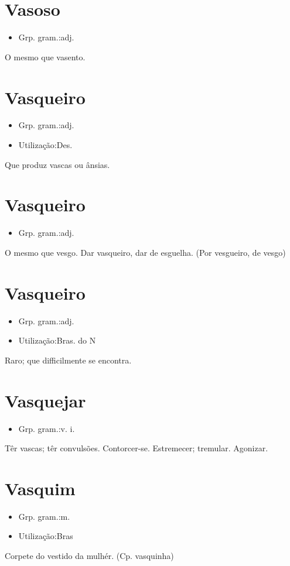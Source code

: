\documentclass{article}
\begin{document}
\section{Vasoso}
\begin{itemize}
\item {Grp. gram.:adj.}
\end{itemize}
O mesmo que \textunderscore vasento\textunderscore .
\section{Vasqueiro}
\begin{itemize}
\item {Grp. gram.:adj.}
\end{itemize}
\begin{itemize}
\item {Utilização:Des.}
\end{itemize}
Que produz vascas ou ânsias.
\section{Vasqueiro}
\begin{itemize}
\item {Grp. gram.:adj.}
\end{itemize}
O mesmo que \textunderscore vesgo\textunderscore .
\textunderscore Dar vasqueiro\textunderscore , dar de esguelha.
(Por \textunderscore vesgueiro\textunderscore , de \textunderscore vesgo\textunderscore )
\section{Vasqueiro}
\begin{itemize}
\item {Grp. gram.:adj.}
\end{itemize}
\begin{itemize}
\item {Utilização:Bras. do N}
\end{itemize}
Raro; que difficilmente se encontra.
\section{Vasquejar}
\begin{itemize}
\item {Grp. gram.:v. i.}
\end{itemize}
Têr vascas; têr convulsões.
Contorcer-se.
Estremecer; tremular.
Agonizar.
\section{Vasquim}
\begin{itemize}
\item {Grp. gram.:m.}
\end{itemize}
\begin{itemize}
\item {Utilização:Bras}
\end{itemize}
Corpete do vestido da mulhér.
(Cp. \textunderscore vasquinha\textunderscore )
\end{document}
